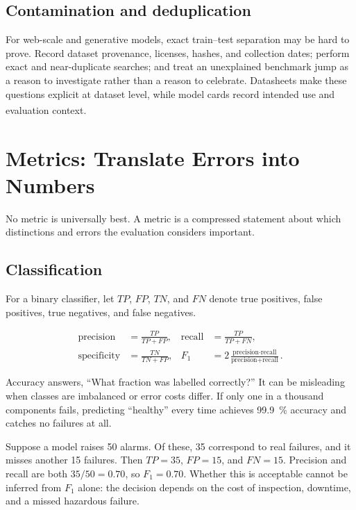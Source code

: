\subsection{Contamination and deduplication}

For web-scale and generative models, exact train--test separation may be hard
to prove.
Record dataset provenance, licenses, hashes, and collection dates; perform
exact and near-duplicate searches; and treat an unexplained benchmark jump as
a reason to investigate rather than a reason to celebrate.
Datasheets make these questions explicit at dataset level, while model cards
record intended use and evaluation
context.\textsuperscript{\cite{gebruDatasheetsDatasets2021,
mitchellModelCardsModel2019}}

\section{Metrics: Translate Errors into Numbers}

No metric is universally best.
A metric is a compressed statement about which distinctions and errors the
evaluation considers important.

\subsection{Classification}

For a binary classifier, let $TP$, $FP$, $TN$, and $FN$ denote true positives,
false positives, true negatives, and false negatives.

\begin{align}
    \text{precision} &= \frac{TP}{TP+FP},
    &\text{recall} &= \frac{TP}{TP+FN},
    \label{eq:precision-recall}\\
    \text{specificity} &= \frac{TN}{TN+FP},
    &F_1 &= 2\frac{\text{precision}\cdot\text{recall}}
                    {\text{precision}+\text{recall}}.
    \label{eq:specificity-f1}
\end{align}

Accuracy answers, ``What fraction was labelled correctly?''
It can be misleading when classes are imbalanced or error costs differ.
If only one in a thousand components fails, predicting ``healthy'' every time
achieves \qty{99.9}{\percent} accuracy and catches no failures at all.

\begin{workedexample}
Suppose a model raises 50 alarms.
Of these, 35 correspond to real failures, and it misses another 15 failures.
Then $TP=35$, $FP=15$, and $FN=15$.
Precision and recall are both $35/50=0.70$, so $F_1=0.70$.
Whether this is acceptable cannot be inferred from $F_1$ alone: the decision
depends on the cost of inspection, downtime, and a missed hazardous failure.
\end{workedexample}

